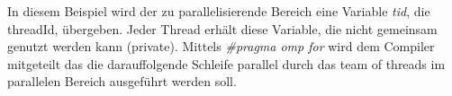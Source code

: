 \documentclass[11pt]{scrartcl}
\begin{document}

In diesem Beispiel wird der zu parallelisierende Bereich eine Variable \textit{tid}, die threadId, übergeben. Jeder Thread erhält diese Variable, die nicht gemeinsam genutzt werden kann (private). Mittels \textit{\#pragma omp for} wird dem Compiler mitgeteilt das die darauffolgende Schleife parallel durch das team of threads  im parallelen Bereich ausgeführt werden soll.
\end{document}
